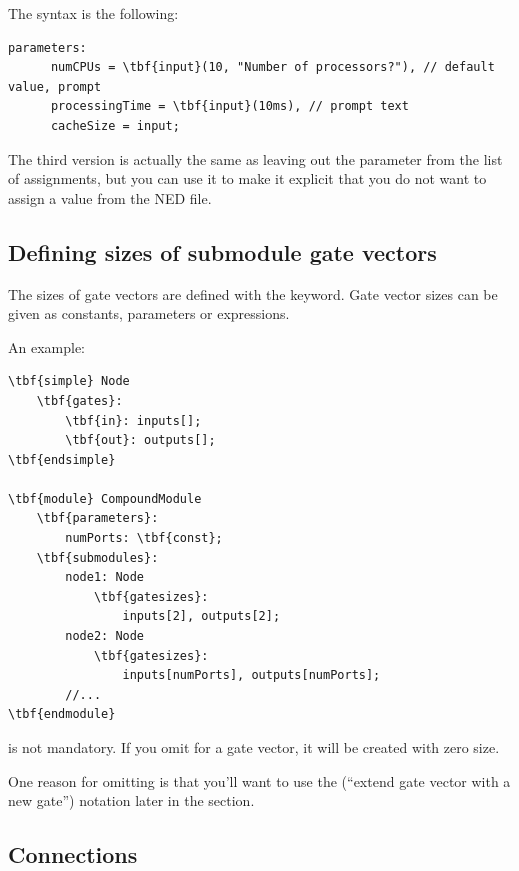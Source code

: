 The syntax is the following:

\begin{Verbatim}[commandchars=\\\{\}]
   parameters:
      numCPUs = \tbf{input}(10, "Number of processors?"), // default value, prompt
      processingTime = \tbf{input}(10ms), // prompt text
      cacheSize = input;
\end{Verbatim}

The third version is actually the same as leaving out the parameter
from the list of assignments, but you can use it to make it explicit
that you do not want to assign a value from the NED file.


\subsection{Defining sizes of submodule gate vectors}


The sizes of gate vectors are defined with the
 keyword.  Gate vector sizes
can be given as constants, parameters or expressions.

An example:

\begin{Verbatim}[commandchars=\\\{\}]
\tbf{simple} Node
    \tbf{gates}:
        \tbf{in}: inputs[];
        \tbf{out}: outputs[];
\tbf{endsimple}

\tbf{module} CompoundModule
    \tbf{parameters}:
        numPorts: \tbf{const};
    \tbf{submodules}:
        node1: Node
            \tbf{gatesizes}:
                inputs[2], outputs[2];
        node2: Node
            \tbf{gatesizes}:
                inputs[numPorts], outputs[numPorts];
        //...
\tbf{endmodule}
\end{Verbatim}


 is not mandatory.
If you omit  for a gate vector, it will be created with zero size.

One reason for omitting  is that you'll want to use
the  (``extend gate vector with a new gate'') notation later in the
 section.



\subsection{Connections}


